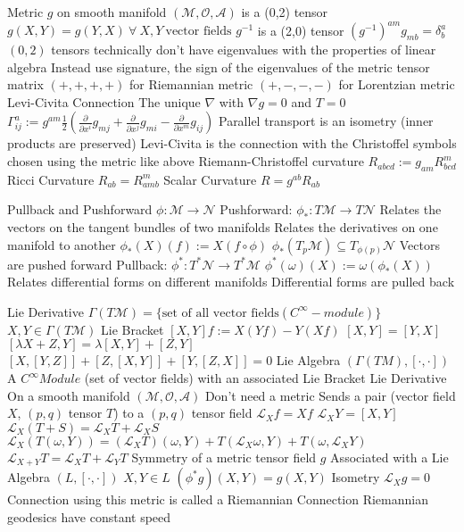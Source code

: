\documentclass[14pt]{extarticle}
\begin{document}
\begin{outline}
		\1	Metric $g$ on smooth manifold $(\mathcal{M},\mathcal{O},\mathcal{A})$ is a (0,2) tensor
			\2	$g(X,Y) = g(Y,X)~\forall~X,Y~\text{vector fields}$
			\2	$g^{-1}$ is a (2,0) tensor
			\2	$(g^{-1})^{am}g_{mb} = \delta^a_b$
			\2	$(0,2)$ tensors technically don't have eigenvalues with the properties of linear algebra
				\3	Instead use signature, the sign of the eigenvalues of the metric tensor matrix
				\3	$(+,+,+,+)$ for Riemannian metric	
				\3	$(+,-,-,-)$ for Lorentzian metric
			\2	Levi-Civita Connection
				\3	The unique $\nabla$ with $\nabla g = 0$ and $T = 0$
				\3	$\Gamma^a_{ij} := g^{am} \frac{1}{2}(\frac{\partial}{\partial x^i}g_{mj} +
							\frac{\partial}{\partial x^j}g_{mi} - \frac{\partial}{\partial x^m}g_{ij})$
				\3	Parallel transport is an isometry (inner products are preserved)
				\3	Levi-Civita is the connection with the Christoffel symbols chosen using the
						metric like above
			\2	Riemann-Christoffel curvature
				\3	$R_{abcd} := g_{am}R^m_{bcd}$
			\2	Ricci Curvature
				\3	$R_{ab} = R^m_{amb}$
			\2	Scalar Curvature
				\3	$R = g^{ab}R_{ab}$

		\1	Pullback and Pushforward
			\2	$\phi : \mathcal{M} \rightarrow \mathcal{N}$
			\2	Pushforward:	$\phi_* : T\mathcal{M} \rightarrow T\mathcal{N}$
				\3	Relates the vectors on the tangent bundles of two manifolds
				\3	Relates the derivatives on one manifold to another
				\3	$\phi_*(X)(f) := X(f \circ \phi)$
				\3	$\phi_*(T_p\mathcal{M}) \subseteq T_{\phi(p)}\mathcal{N}$
				\3	Vectors are pushed forward
			\2	Pullback:	$\phi^* : T^*\mathcal{N} \rightarrow T^*\mathcal{M}$
				\3	$\phi^*(\omega)(X) := \omega(\phi_*(X))$
				\3	Relates differential forms on different manifolds
				\3	Differential forms are pulled back

		\1	Lie Derivative
			\2	$\Gamma(T\mathcal{M}) = \{\text{set of all vector fields}(C^{\infty}-module)\}$
				\3	$X,Y \in \Gamma(T\mathcal{M})$
			\2	Lie Bracket
				\3	$[X,Y]f := X(Yf) - Y(Xf)$
				\3	$[X,Y] = [Y,X]$
				\3	$[\lambda X + Z, Y] = \lambda [X,Y] + [Z,Y]$
				\3	$[X,[Y,Z]] + [Z,[X,Y]] + [Y,[Z,X]] = 0$
			\2	Lie Algebra $(\Gamma(TM),[\cdot,\cdot])$
				\3	A $C^{\infty} Module$ (set of vector fields) with an associated Lie Bracket
			\2	Lie Derivative
				\3	On a smooth manifold $(\mathcal{M},\mathcal{O},\mathcal{A})$
					\4	Don't need a metric
				\3	Sends a pair (vector field $X$, $(p,q)$ tensor $T$) to a $(p,q)$ tensor field
				\3	$\mathcal{L}_Xf = Xf$
				\3	$\mathcal{L}_XY = [X,Y]$	
				\3	$\mathcal{L}_X(T + S) = \mathcal{L}_XT + \mathcal{L}_XS$
				\3	$\mathcal{L}_X(T(\omega,Y)) = (\mathcal{L}_XT)(\omega,Y) + T(\mathcal{L}_X\omega,Y) + T(\omega,\mathcal{L}_XY)$
				\3	$\mathcal{L}_{X + Y} T = \mathcal{L}_XT + \mathcal{L}_YT$
			\2	Symmetry of a metric tensor field $g$
				\3	Associated with a Lie Algebra $(L,[\cdot,\cdot])$
				\3	$X,Y \in L$	
				\3	$(\phi^*g)(X,Y) = g(X,Y)$
				\3	Isometry
				\3	$\mathcal{L}_Xg = 0$
				\3	Connection using this metric is called a Riemannian Connection
				\3	Riemannian geodesics have constant speed

	\end{outline}
\end{document}

